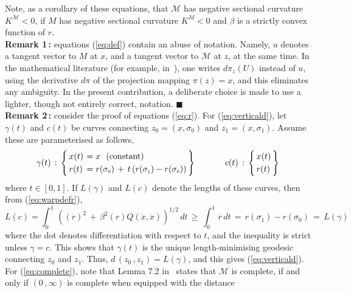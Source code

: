 \documentclass{svmult}
\begin{document}
Note, as a corollary of these equations, that $\mathcal{M}$ has negative sectional curvature $K^\mathcal{M} < 0$, if $M$ has negative sectional curvature $K^M < 0$ and $\beta$ is a strictly convex function of $r$. \\[0.1cm]
\textbf{Remark 1\,:} equations (\ref{eq:def}) contain an abuse of notation. Namely, $u$ denotes a tangent vector to $M$ at $x$, and a tangent vector to $\mathcal{M}$ at $z$, at the same time. In the mathematical literature (for example, in~\cite{bishop}\cite{oneil}), one writes $d\pi_z(U)$ instead of $u$, using the derivative $d\pi$ of the projection mapping $\pi(z) = x$, and this eliminates any ambiguity. In the present contribution, a deliberate choice is made to use a lighter, though not entirely correct, notation. \hfill$\blacksquare$\\[0.1cm]
\textbf{Remark 2\,:} consider the proof of equations (\ref{eq:r}). For (\ref{eq:verticald}), let $\gamma(t)$ and $c(t)$ be curves connecting $z_{\scriptscriptstyle 0} = (x,\sigma_{\scriptscriptstyle 0})$ and $z_{\scriptscriptstyle 1} = (x,\sigma_{\scriptscriptstyle 1})$. Assume these are parameterised as follows, 
$$
\gamma(t)\,:\,\left\lbrace\!\! \begin{array}{ll}
x(t) \hspace{-0.1cm}& \!\!= x \, \, \text{ (constant)}  \\[0.1cm]
r(t) \hspace{-0.3cm}& \!\!= r(\sigma_{\scriptscriptstyle 0}) \,+\, t\, (r(\sigma_{\scriptscriptstyle 1})-r(\sigma_{\scriptscriptstyle 0}))
\end{array}\!\!\right\rbrace
\hspace{1.2cm}
c(t)\,:\,\left\lbrace\!\! \begin{array}{l}
x(t) \\[0.1cm]
r(t)
\end{array}\!\!\right\rbrace
$$
where $t \in [0,1]$. If $L(\gamma)$ and $L(c)$ denote the lengths of these curves, then from (\ref{eq:warpdefr}),
$$
L(c) = \int^1_0\, \left( \left(\dot{r}\right)^2 \,+\, \beta^2(r) Q(\dot{x},\dot{x})\right)^{1/2}\,dt \,\geq\, \int^1_0\, \dot{r}\,dt
\,=\, r(\sigma_{\scriptscriptstyle 1})-r(\sigma_{\scriptscriptstyle 0}) \,=\, L(\gamma)$$
where the dot denotes differentiation with respect to $t$, and the inequality is strict unless $\gamma = c$. This shows that $\gamma(t)$ is the unique 
length-minimising geodesic connecting $z_{\scriptscriptstyle 0}$ and $z_{\scriptscriptstyle 1}$. Thus, $d\,\!(z_{\scriptscriptstyle 0}\,\!,z_{\scriptscriptstyle 1}) = L(\gamma)$, and this gives (\ref{eq:verticald}). For (\ref{eq:complete}), note that Lemma 7.2 in~\cite{bishop} states that $\mathcal{M}$ is complete, if and only if $(0\,,\infty)$ is complete when equipped with the distance
\end{document}
